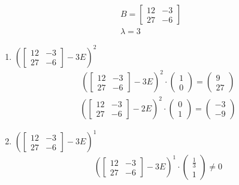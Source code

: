 \begin{gather*}
	B = 
	\begin{bmatrix}
		12 & -3 \\ 27 & -6
	\end{bmatrix}\\
	\lambda = 3
\end{gather*}
\begin{enumerate}
	\item 
	$\left(\begin{bmatrix}
		12 & -3\\ 27 & -6
	\end{bmatrix} - 3E\right)^2$ 
	\begin{gather*}
	\left(\begin{bmatrix}
		12 & -3\\ 27 & -6
	\end{bmatrix} - 3E\right)^2
	\cdot
	\begin{pmatrix}
		1 \\ 0
	\end{pmatrix}
	=
	\begin{pmatrix}
		9 \\ 27
	\end{pmatrix}
	\end{gather*}
	\vskip 0.1in
	\begin{gather*}
	\left(\begin{bmatrix}
		12 & -3\\ 27 & -6
	\end{bmatrix} - 2E\right)^2
	\cdot
	\begin{pmatrix}
		0 \\ 1
	\end{pmatrix}
	=
	\begin{pmatrix}
		-3 \\ -9
	\end{pmatrix}
	\end{gather*}
	
	\item 
	$\left(\begin{bmatrix}
		12 & -3\\ 27 & -6
	\end{bmatrix} - 3E\right)^1$ 
	\begin{gather*}
	\left(\begin{bmatrix}
		12 & -3\\ 27 & -6
	\end{bmatrix} - 3E\right)^1
	\cdot
	\begin{pmatrix}
		\frac{1}{3} \\ 1
	\end{pmatrix}
	\ne 0
	\end{gather*}
\end{enumerate}
